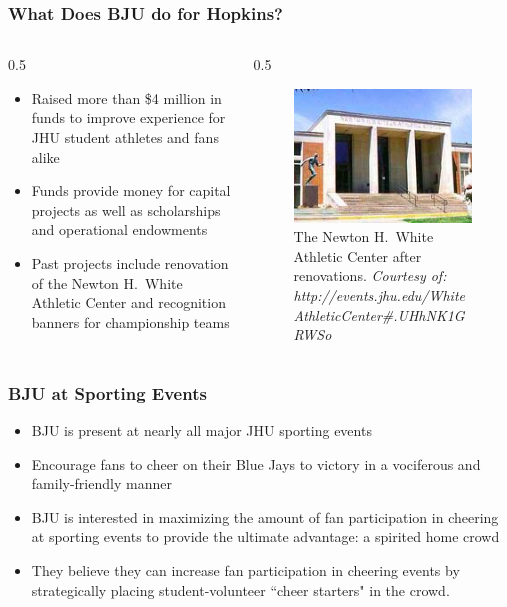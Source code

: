 \documentclass[compress,handout,10pt]{beamer}
\let\olditem\item
\renewcommand{\item}{\setlength{\itemsep}{0.5\baselineskip}\olditem}
\begin{document}
\begin{frame}
	\frametitle{What Does BJU do for Hopkins?}
	\begin {columns}
		\begin {column} {0.5\textwidth}
		\begin {itemize}
			\item Raised more than \$4 million in funds to improve experience for JHU student athletes and fans alike \cite{bjuwebsite}
			\item Funds provide money for capital projects as well as scholarships and operational endowments \cite{bjuwebsite}
			\item Past projects include renovation of the Newton H.~White Athletic Center and recognition banners for championship teams \cite{bjuwebsite}
		\end {itemize}
	\end {column}
	\begin{column} {0.5\textwidth}
		\begin{figure}
			\begin{center}
				\includegraphics [width=2in] {AthleticCenter.jpg}
				\caption{{\tiny The Newton H.~White Athletic Center after renovations. \textit{Courtesy of: http://events.jhu.edu/WhiteAthleticCenter\#.UHhNK1GRWSo}}}
			\end{center}
		\end {figure}
	\end {column}
\end {columns}
\end {frame}

\begin{frame}
\frametitle{BJU at Sporting Events}
\begin{itemize}
\item BJU is present at nearly all major JHU sporting events
\item Encourage fans to cheer on their Blue Jays to victory in a vociferous and family-friendly manner
\item BJU is interested in maximizing the amount of fan participation in cheering at sporting events to provide the ultimate advantage: a spirited home crowd
\item They believe they can increase fan participation in cheering events by strategically placing student-volunteer ``cheer starters" in the crowd. 
\end{itemize}
\end{frame}
\end{document}
